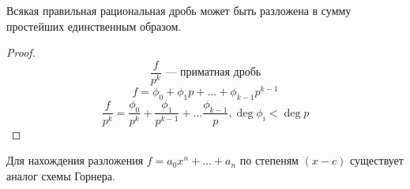 \begin{consequence}
  \label{consequence:03_2}
  Всякая правильная рациональная дробь может быть разложена в сумму простейших единственным образом.
\end{consequence}
\begin{proof}
\[
\frac{f}{p ^{k}} \text{ --- приматная дробь}
\]
\[
f = \phi_0 + \phi_1 p + \ldots + \phi_{k - 1} p ^{k - 1}
\]
\[
\frac{f}{p ^{k}} = \frac{\phi_0}{p ^{k}} + \frac{\phi_1}{p ^{k - 1}} + \ldots \frac{\phi_{k - 1}}{p}, \deg \phi_i < \deg p
\]
\end{proof}
\begin{note}
  Для нахождения разложения $f = a_0 x^{n} + \ldots + a_n$ по степеням $(x - c)$ существует аналог схемы Горнера.
\end{note}
